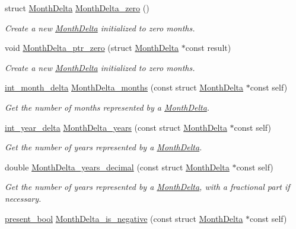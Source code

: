 \begin{DoxyCompactItemize}
struct \hyperlink{structMonthDelta}{Month\-Delta} \hyperlink{month-delta_8h_aca81ef97d8ec1cd052ab391636f16bf7}{Month\-Delta\-\_\-zero} ()
\begin{DoxyCompactList}\small\item\em Create a new \hyperlink{structMonthDelta}{Month\-Delta} initialized to zero months. \end{DoxyCompactList}\item 
void \hyperlink{month-delta_8h_aecc1d070d7db1982cd5f98224f738d35}{Month\-Delta\-\_\-ptr\-\_\-zero} (struct \hyperlink{structMonthDelta}{Month\-Delta} $\ast$const result)
\begin{DoxyCompactList}\small\item\em Create a new \hyperlink{structMonthDelta}{Month\-Delta} initialized to zero months. \end{DoxyCompactList}\item 
\hyperlink{types_8h_adc711c00c117528b40875ad0119c687f}{int\-\_\-month\-\_\-delta} \hyperlink{month-delta_8h_aa35507c658c9d6f3a038b44d1cdb6452}{Month\-Delta\-\_\-months} (const struct \hyperlink{structMonthDelta}{Month\-Delta} $\ast$const self)
\begin{DoxyCompactList}\small\item\em Get the number of months represented by a \hyperlink{structMonthDelta}{Month\-Delta}. \end{DoxyCompactList}\item 
\hyperlink{types_8h_ad2a6eecbd190f1ae0327acdeaf596623}{int\-\_\-year\-\_\-delta} \hyperlink{month-delta_8h_aaccb951f5a7295ce0cc3d9b6b77f2d21}{Month\-Delta\-\_\-years} (const struct \hyperlink{structMonthDelta}{Month\-Delta} $\ast$const self)
\begin{DoxyCompactList}\small\item\em Get the number of years represented by a \hyperlink{structMonthDelta}{Month\-Delta}. \end{DoxyCompactList}\item 
double \hyperlink{month-delta_8h_a9215cb412f007649e357ba8cd9e171b9}{Month\-Delta\-\_\-years\-\_\-decimal} (const struct \hyperlink{structMonthDelta}{Month\-Delta} $\ast$const self)
\begin{DoxyCompactList}\small\item\em Get the number of years represented by a \hyperlink{structMonthDelta}{Month\-Delta}, with a fractional part if necessary. \end{DoxyCompactList}\item 
\hyperlink{types_8h_a1c24e2cdd988b886e889080ded176ae0}{present\-\_\-bool} \hyperlink{month-delta_8h_ada77ded958313a9162d1a7337b0374c7}{Month\-Delta\-\_\-is\-\_\-negative} (const struct \hyperlink{structMonthDelta}{Month\-Delta} $\ast$const self)

\end{DoxyCompactItemize}
